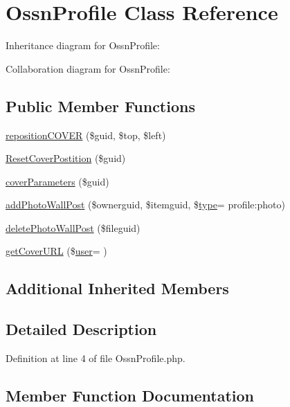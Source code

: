 \hypertarget{class_ossn_profile}{}\section{Ossn\+Profile Class Reference}
\label{class_ossn_profile}


Inheritance diagram for Ossn\+Profile\+:


Collaboration diagram for Ossn\+Profile\+:
\subsection*{Public Member Functions}
\begin{DoxyCompactItemize}
\item 
\hyperlink{class_ossn_profile_a3e27e9dc5d2c3e06eea8801353ebab6f}{reposition\+C\+O\+V\+ER} (\$guid, \$top, \$left)
\item 
\hyperlink{class_ossn_profile_af3c559710a53f8f4d88f38044505ee90}{Reset\+Cover\+Postition} (\$guid)
\item 
\hyperlink{class_ossn_profile_a680f6835f3771d0af210dec9e142dd2c}{cover\+Parameters} (\$guid)
\item 
\hyperlink{class_ossn_profile_a62d06508239ce032c071340235925ff0}{add\+Photo\+Wall\+Post} (\$ownerguid, \$itemguid, \$\hyperlink{_ossn_wall_2actions_2wall_2post_2group_8php_a2dc1bb4e1ed0029daa81ac0776b14b51}{type}= \textquotesingle{}profile\+:photo\textquotesingle{})
\item 
\hyperlink{class_ossn_profile_abac2150731ec3868c2f8ba12ad2aafb2}{delete\+Photo\+Wall\+Post} (\$fileguid)
\item 
\hyperlink{class_ossn_profile_a0bf031870419a14114570d1085ae8134}{get\+Cover\+U\+RL} (\$\hyperlink{ossn_8config_8db_8example_8php_a802544b7ba9f79bbf24ef67773d53bed}{user}= \textquotesingle{}\textquotesingle{})
\end{DoxyCompactItemize}
\subsection*{Additional Inherited Members}


\subsection{Detailed Description}


Definition at line 4 of file Ossn\+Profile.\+php.



\subsection{Member Function Documentation}
